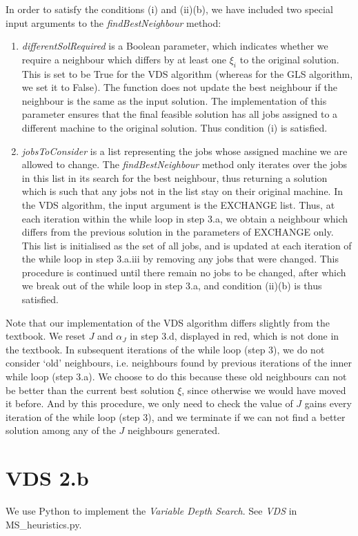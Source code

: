\documentclass[12pt,a4paper,reqno]{article}
\begin{document}
In order to satisfy the conditions (i) and (ii)(b), we have included two special input arguments to the \textit{findBestNeighbour} method:
\begin{enumerate}
\item \textit{differentSolRequired} is a Boolean parameter, which indicates whether we require a neighbour which differs by at least one $\xi_i$ to the original solution. This is set to be True for the VDS algorithm (whereas for the GLS algorithm, we set it to False). The function does not update the best neighbour if the neighbour is the same as the input solution. The implementation of this parameter ensures that the final feasible solution has all jobs assigned to a different machine to the original solution. Thus condition (i) is satisfied.
\item \textit{jobsToConsider} is a list representing the jobs whose assigned machine we are allowed to change. The \textit{findBestNeighbour} method only iterates over the jobs in this list in its search for the best neighbour, thus returning a solution which is such that any jobs not in the list stay on their original machine. In the VDS algorithm, the input argument is the EXCHANGE list. Thus, at each iteration within the while loop in step 3.a, we obtain a neighbour which differs from the previous solution in the parameters of EXCHANGE only. This list is initialised as the set of all jobs, and is updated at each iteration of the while loop in step 3.a.iii by removing any jobs that were changed. This procedure is continued until there remain no jobs to be changed, after which we break out of the while loop in step 3.a, and condition (ii)(b) is thus satisfied.
\end{enumerate}

Note that our implementation of the VDS algorithm differs slightly from the textbook. We reset $J$ and $\alpha_J$ in step 3.d, displayed in red, which is not done in the textbook. In subsequent iterations of the while loop (step 3), we do not consider `old' neighbours, i.e. neighbours found by previous iterations of the inner while loop (step 3.a). We choose to do this because these old neighbours can not be better than the current best solution $\xi$, since otherwise we would have moved it before. And by this procedure, we only need to check the value of $J$ gains every iteration of the while loop (step 3), and we terminate if we can not find a better solution among any of the $J$ neighbours generated.

\section*{VDS 2.b}
We use Python to implement the \emph{Variable Depth Search}. See \emph{VDS} in MS\_heuristics.py.
\end{document}
